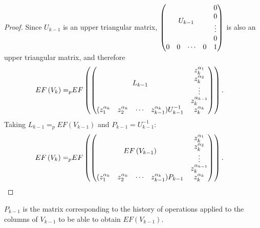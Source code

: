 \documentclass[11pt]{llncs}
\begin{document}
\begin{proof}
    
    Since $U_{k-1}$ is an upper triangular matrix, $ \begin{pmatrix}
            \multicolumn{4}{c}{\multirow{4}{*}{$U_{k-1}$}} & 0\\
            & & & & 0\\
            & & & & \vdots\\
            & & & & 0\\
            0 & 0& \cdots & 0 & 1
        \end{pmatrix}$ is also an upper triangular matrix, and therefore
\vspace{-0.2cm}
      \begin{align*}
        EF\left(V_{k}\right) =_p & EF
        \begin{pmatrix}
        \begin{pmatrix}
            \multicolumn{4}{c}{\multirow{4}{*}{$L_{k-1}$}} & z_k^{\alpha_1}\\
            & & & & z_k^{\alpha_2}\\
            & & & & \vdots\\
            & & & & z_{k}^{\alpha_{k-1}}\\
            (z_1^{\alpha_{k}} & z_2^{\alpha_{k}}& \cdots & z_{k-1}^{\alpha_{k}})U_{k-1}^{-1} & z_{k}^{\alpha_k}
        \end{pmatrix}
        \end{pmatrix}.
    \end{align*}
    Taking $L_{k-1} =_p EF\left(V_{k-1}\right)$ and $P_{k-1} = U_{k-1}^{-1}$:
    \begin{align*}
        EF\left(V_{k}\right) =_p & EF
        \begin{pmatrix}
        \begin{pmatrix}
            \multicolumn{4}{c}{\multirow{4}{*}{$EF\left(V_{k-1}\right)$}} & z_k^{\alpha_1}\\
            & & & & z_k^{\alpha_2}\\
            & & & & \vdots\\
            & & & & z_{k}^{\alpha_{k-1}}\\
            (z_1^{\alpha_{k}} & z_2^{\alpha_{k}}& \cdots & z_{k-1}^{\alpha_{k}})P_{k-1} & z_{k}^{\alpha_k}
        \end{pmatrix}
        \end{pmatrix}.
    \end{align*}
\end{proof}

\begin{remark}\label{rem:historyOfOperations}
    $P_{k-1}$ is the matrix corresponding to the history of operations applied to the columns of $V_{k-1}$ to be able to obtain $EF\left(V_{k-1}\right)$.
\end{remark}
\end{document}
